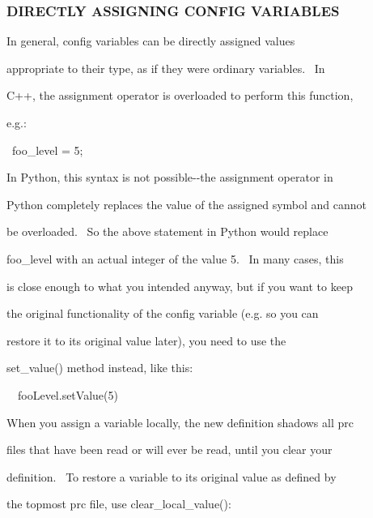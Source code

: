\documentclass[a4paper]{article}
\begin{document}
\bigskip

\subsubsection[DIRECTLY ASSIGNING CONFIG VARIABLES]{DIRECTLY ASSIGNING CONFIG VARIABLES}
\hypertarget{RefHeading312341927442421}{}
\bigskip

{\color{black}
In general, config variables can be directly assigned values}

{\color{black}
appropriate to their type, as if they were ordinary variables. \ In}

{\color{black}
C++, the assignment operator is overloaded to perform this function,}

\clearpage
\bigskip

{\color{black}
e.g.:}

{\color{black}
\ foo\_level = 5;}

{\color{black}
In Python, this syntax is not possible-{}-the assignment operator in}

{\color{black}
Python completely replaces the value of the assigned symbol and cannot}

{\color{black}
be overloaded. \ So the above statement in Python would replace}

{\color{black}
foo\_level with an actual integer of the value 5. \ In many cases, this}

{\color{black}
is close enough to what you intended anyway, but if you want to keep}

{\color{black}
the original functionality of the config variable (e.g. so you can}

{\color{black}
restore it to its original value later), you need to use the}

{\color{black}
set\_value() method instead, like this:}


\bigskip

{\color{black}
\ \ fooLevel.setValue(5)}


\bigskip

{\color{black}
When you assign a variable locally, the new definition shadows all prc}

{\color{black}
files that have been read or will ever be read, until you clear your}

{\color{black}
definition. \ To restore a variable to its original value as defined by}

{\color{black}
the topmost prc file, use clear\_local\_value():}
\end{document}
